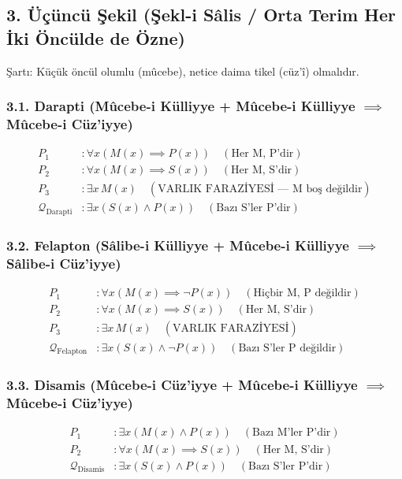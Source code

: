 \documentclass[11pt, a4paper]{article}
\begin{document}
\subsection{3. Üçüncü Şekil (Şekl-i Sâlis / Orta Terim Her İki Öncülde de Özne)}
Şartı: Küçük öncül olumlu (mûcebe), netice daima tikel (cüz'î) olmalıdır.

\subsubsection{3.1. Darapti (Mûcebe-i Külliyye + Mûcebe-i Külliyye $\implies$ Mûcebe-i Cüz'iyye)}
\begin{align}
P_1 &: \forall x (M(x) \implies P(x)) \quad (\text{Her M, P'dir}) \\
P_2 &: \forall x (M(x) \implies S(x)) \quad (\text{Her M, S'dir}) \\
P_3 &: \exists x \, M(x) \quad (\text{VARLIK FARAZİYESİ --- M boş değildir}) \\
\mathcal{Q}_{\text{Darapti}} &: \exists x (S(x) \land P(x)) \quad (\text{Bazı S'ler P'dir})
\end{align}

\subsubsection{3.2. Felapton (Sâlibe-i Külliyye + Mûcebe-i Külliyye $\implies$ Sâlibe-i Cüz'iyye)}
\begin{align}
P_1 &: \forall x (M(x) \implies \neg P(x)) \quad (\text{Hiçbir M, P değildir}) \\
P_2 &: \forall x (M(x) \implies S(x)) \quad (\text{Her M, S'dir}) \\
P_3 &: \exists x \, M(x) \quad (\text{VARLIK FARAZİYESİ}) \\
\mathcal{Q}_{\text{Felapton}} &: \exists x (S(x) \land \neg P(x)) \quad (\text{Bazı S'ler P değildir})
\end{align}

\subsubsection{3.3. Disamis (Mûcebe-i Cüz'iyye + Mûcebe-i Külliyye $\implies$ Mûcebe-i Cüz'iyye)}
\begin{align}
P_1 &: \exists x (M(x) \land P(x)) \quad (\text{Bazı M'ler P'dir}) \\
P_2 &: \forall x (M(x) \implies S(x)) \quad (\text{Her M, S'dir}) \\
\mathcal{Q}_{\text{Disamis}} &: \exists x (S(x) \land P(x)) \quad (\text{Bazı S'ler P'dir})
\end{align}
\end{document}
